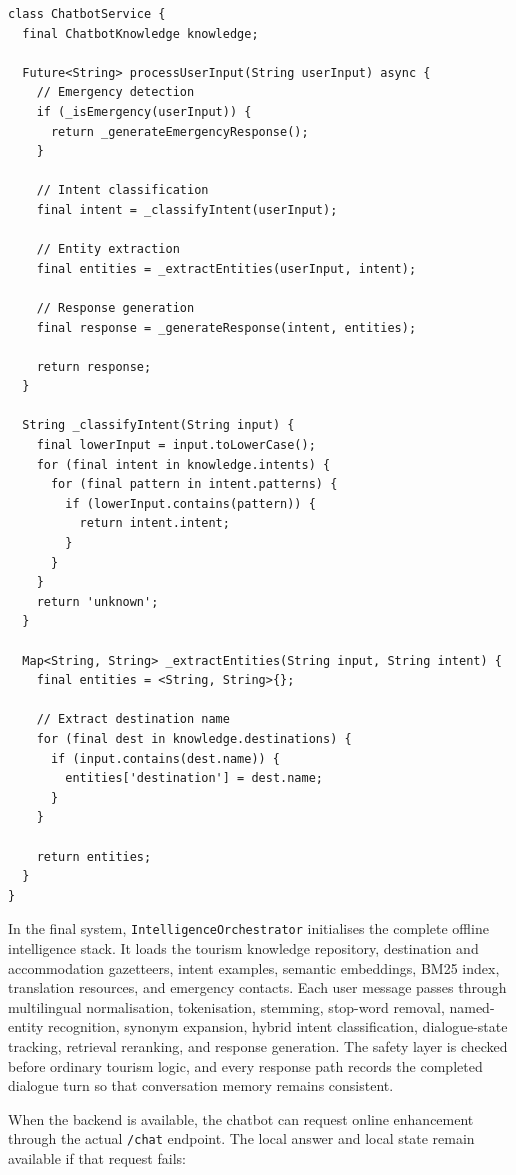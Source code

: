\documentclass[12pt,a4paper,oneside]{report}
\begin{document}
\begin{lstlisting}
class ChatbotService {
  final ChatbotKnowledge knowledge;
  
  Future<String> processUserInput(String userInput) async {
    // Emergency detection
    if (_isEmergency(userInput)) {
      return _generateEmergencyResponse();
    }
    
    // Intent classification
    final intent = _classifyIntent(userInput);
    
    // Entity extraction
    final entities = _extractEntities(userInput, intent);
    
    // Response generation
    final response = _generateResponse(intent, entities);
    
    return response;
  }
  
  String _classifyIntent(String input) {
    final lowerInput = input.toLowerCase();
    for (final intent in knowledge.intents) {
      for (final pattern in intent.patterns) {
        if (lowerInput.contains(pattern)) {
          return intent.intent;
        }
      }
    }
    return 'unknown';
  }
  
  Map<String, String> _extractEntities(String input, String intent) {
    final entities = <String, String>{};
    
    // Extract destination name
    for (final dest in knowledge.destinations) {
      if (input.contains(dest.name)) {
        entities['destination'] = dest.name;
      }
    }
    
    return entities;
  }
}
\end{lstlisting}

In the final system, \texttt{IntelligenceOrchestrator} initialises the complete offline intelligence stack. It loads the tourism knowledge repository, destination and accommodation gazetteers, intent examples, semantic embeddings, BM25 index, translation resources, and emergency contacts. Each user message passes through multilingual normalisation, tokenisation, stemming, stop-word removal, named-entity recognition, synonym expansion, hybrid intent classification, dialogue-state tracking, retrieval reranking, and response generation. The safety layer is checked before ordinary tourism logic, and every response path records the completed dialogue turn so that conversation memory remains consistent.

When the backend is available, the chatbot can request online enhancement through the actual \texttt{/chat} endpoint. The local answer and local state remain available if that request fails:
\end{document}
